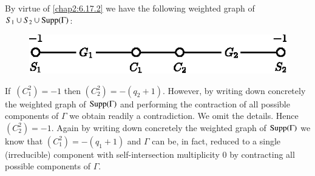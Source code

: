 \subsubsection{}\label{chap2:6.17.3}
By virtue of \ref{chap2:6.17.2} we have the following weighted graph of
$S_{1}\cup S_{2}\cup \operatorname{Supp}(\Gamma)$:
\begin{figure}[H]
\centering
\includegraphics{figures/chap2-fig41.eps}
\end{figure}
If\pageoriginale\ $(C^{2}_{1})=-1$ then
$(C^{2}_{2})=-(q_{2}+1)$. However, by writing down concretely the
weighted graph of $\operatorname{Supp}(\Gamma)$ and performing the contraction of
all possible components of $\Gamma$ we obtain readily a
contradiction. We omit the details. Hence $(C^{2}_{2})=-1$. Again by
writing down concretely the weighted graph of $\operatorname{Supp}(\Gamma)$ we know
that $(C^{2}_{1})=-(q_{1}+1)$ and $\Gamma$ can be, in fact, reduced to
a single (irreducible) component with self-intersection multiplicity
$0$ by contracting all possible components of $\Gamma$.

